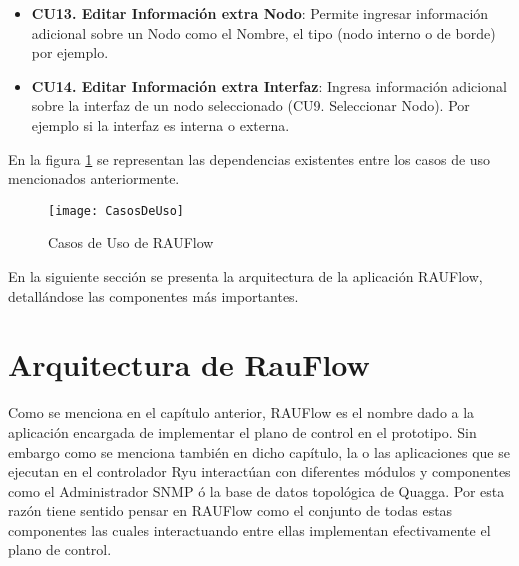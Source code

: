\begin{itemize}
\item \textbf{CU13. Editar Informaci\'on extra Nodo}: Permite ingresar informaci\'on adicional sobre un Nodo como el Nombre, el tipo (nodo interno o de borde) por ejemplo.

\item \textbf{CU14. Editar Informaci\'on extra Interfaz}: Ingresa informaci\'on adicional sobre la interfaz de un nodo seleccionado (CU9. Seleccionar Nodo). Por ejemplo si la interfaz es interna o externa.
\end{itemize}

En la figura \ref{fig:CasosDeUso} se representan las dependencias existentes entre los casos de uso mencionados anteriormente.\\

\begin{figure}[ht!] 
\centering    
\texttt{[image: CasosDeUso]}
\caption[Casos de Uso de RAUFlow]{Casos de Uso de RAUFlow}
\label{fig:CasosDeUso}
\end{figure}

En la siguiente secci\'on se presenta la arquitectura de la aplicaci\'on RAUFlow, detallándose las componentes m\'as importantes.


\section[Arquitectura de RauFlow]{Arquitectura de RauFlow}


Como se menciona en el cap\'itulo anterior, RAUFlow es el nombre dado a la aplicaci\'on encargada de implementar el plano de control en el prototipo. Sin embargo como se menciona tambi\'en en dicho cap\'itulo, la o las aplicaciones que se ejecutan en el controlador Ryu interact\'uan con diferentes m\'odulos y componentes como el Administrador SNMP \'o la base de datos topol\'ogica de Quagga. Por esta raz\'on tiene sentido pensar en RAUFlow como el conjunto de todas estas componentes las cuales interactuando entre ellas implementan efectivamente el plano de control.\\

